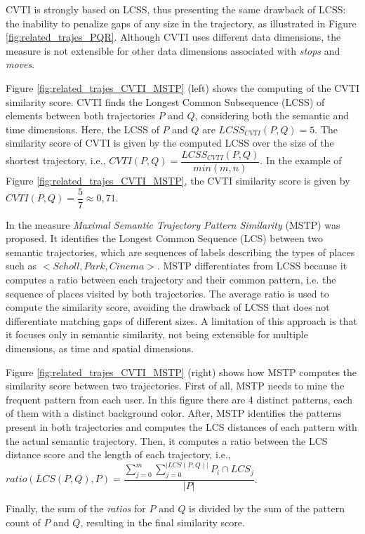 \documentclass[12pt]{article}
\begin{document}
CVTI is strongly based on LCSS, thus presenting the same drawback of LCSS: the inability to penalize gaps of any size in the trajectory, as illustrated in Figure \ref{fig:related_trajes_PQR}. Although CVTI uses different data dimensions, the measure is not extensible for other data dimensions associated with \emph{stops} and \emph{moves}.

Figure \ref{fig:related_trajes_CVTI_MSTP} (left) shows the computing of the CVTI similarity score. CVTI finds the Longest Common Subsequence (LCSS) of elements between both trajectories $P$ and $Q$, considering both the semantic and time dimensions. Here, the LCSS of $P$ and $Q$ are $LCSS_{CVTI}(P, Q) = 5$. The similarity score of CVTI is given by the computed LCSS over the size of the shortest trajectory, i.e., $CVTI(P, Q) = \dfrac{LCSS_{CVTI}(P, Q)}{min(m, n)}$. In the example of Figure \ref{fig:related_trajes_CVTI_MSTP}, the CVTI similarity score is given by $CVTI(P, Q) = \dfrac{5}{7} \approx 0,71$.

In \cite{Ying:2010:MUS:1867699.1867703} the measure \emph{Maximal Semantic Trajectory Pattern Similarity} (MSTP) was proposed. It identifies the Longest Common Sequence (LCS) between two semantic trajectories, which are sequences of labels describing the types of places such as $<Scholl, Park, Cinema>$. MSTP differentiates from LCSS because it computes a ratio between each trajectory and their common pattern, i.e. the sequence of places visited by both trajectories. The average ratio is used to compute the similarity score, avoiding the drawback of LCSS that does not differentiate matching gaps of different sizes. A limitation of this approach is that it focuses only in semantic similarity, not being extensible for multiple dimensions, as time and spatial dimensions.

Figure \ref{fig:related_trajes_CVTI_MSTP} (right) shows how MSTP computes the similarity score between two trajectories. First of all, MSTP needs to mine the frequent pattern from each user. In this figure there are 4 distinct patterns, each of them with a distinct background color. After, MSTP identifies the patterns present in both trajectories and computes the LCS distances of each pattern with the actual semantic trajectory. Then, it computes a ratio between the LCS distance score and the length of each trajectory, i.e., $ratio(LCS(P, Q), P) = \dfrac{\sum\limits_{j=0}^{m} \sum\limits_{j=0}^{|LCS(P,Q)|} P_i \cap LCS_j}{|P|}$.

Finally, the sum of the \emph{ratios} for $P$ and $Q$ is divided by the sum of the pattern count of $P$ and $Q$, resulting in the final similarity score.
\end{document}
